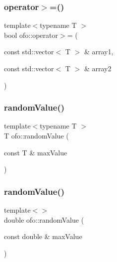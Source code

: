 \mbox{\label{namespaceofo_aeff44072bd4fb8ed491c94e7eb4c2059}} 
\subsubsection{\texorpdfstring{operator$>$=()}{operator>=()}}
{\footnotesize\ttfamily template$<$typename T $>$ \\
bool ofo\+::operator$>$= (\begin{DoxyParamCaption}\item[{const std\+::vector$<$ T $>$ \&}]{array1,  }\item[{const std\+::vector$<$ T $>$ \&}]{array2 }\end{DoxyParamCaption})}

\mbox{\label{namespaceofo_afe5c86df101d1623b1aea71e3ba7b0a9}} 
\subsubsection{\texorpdfstring{random\+Value()}{randomValue()}\hspace{0.1cm}{\footnotesize\ttfamily [1/4]}}
{\footnotesize\ttfamily template$<$typename T $>$ \\
T ofo\+::random\+Value (\begin{DoxyParamCaption}\item[{const T \&}]{max\+Value }\end{DoxyParamCaption})}

\mbox{\label{namespaceofo_a159780949b5de21d2d8358df8abc0ce2}} 
\subsubsection{\texorpdfstring{random\+Value()}{randomValue()}\hspace{0.1cm}{\footnotesize\ttfamily [2/4]}}
{\footnotesize\ttfamily template$<$$>$ \\
double ofo\+::random\+Value (\begin{DoxyParamCaption}\item[{const double \&}]{max\+Value }\end{DoxyParamCaption})}

